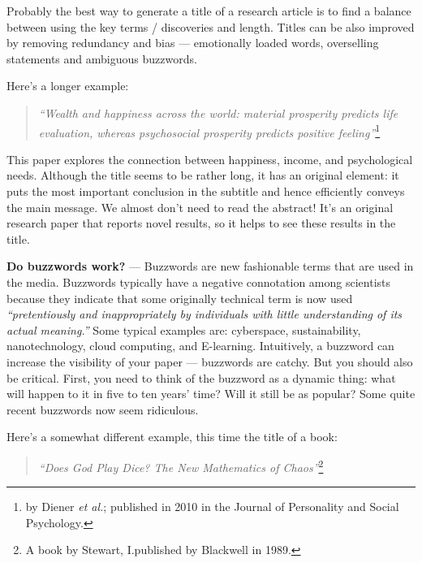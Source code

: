\documentclass[graybox,envcountchap,sectrefs,UStrade]{svmono}
\newenvironment{fminipage}{\begin{Sbox}\begin{minipage}}{\end{minipage}\end{Sbox}\fbox{\TheSbox}}
\begin{document}
\begin{svgraybox}
Probably the best way to generate a title of a research article is to find a balance between using the key terms / discoveries and length. Titles can be also improved by removing redundancy and bias --- emotionally loaded words, overselling statements and ambiguous buzzwords.
\end{svgraybox}

Here's a longer example:

\begin{quote}
    \emph{``Wealth and happiness across the world: material prosperity predicts life evaluation, whereas psychosocial prosperity predicts positive feeling''}\footnote{by Diener \emph{et al.}; published in 2010 in the Journal of Personality and Social Psychology.}
\end{quote}

This paper explores the connection between happiness, income, and psychological needs. Although the title seems to be rather long, it has an original element: it puts the most important conclusion in the subtitle and hence efficiently conveys the main message. We almost don't need to read the abstract! It's an original research paper that reports novel results, so it helps to see these results in the title. \par

\bigskip
\begin{fminipage}{.9\textwidth}{\footnotesize{\textsf{\textbf{Do buzzwords work?}} --- Buzzwords are new fashionable terms that are used in the media. Buzzwords typically have a negative connotation among scientists because they indicate that some originally technical term is now used \emph{``pretentiously and inappropriately by individuals with little understanding of its actual meaning.''} Some typical examples are: cyberspace, sustainability, nanotechnology, cloud computing, and E-learning. Intuitively, a buzzword can increase the visibility of your paper --- buzzwords are catchy. But you should also be critical. First, you need to think of the buzzword as a dynamic thing: what will happen to it in five to ten years' time? Will it still be as popular? Some quite recent buzzwords now seem ridiculous.}}
\end{fminipage}
\bigskip

Here's a somewhat different example, this time the title of a book:

\begin{quote}
    \emph{``Does God Play Dice? The New Mathematics of Chaos''}\footnote{A book by Stewart, I.\@ published by Blackwell in 1989.}
\end{quote}
\end{document}
